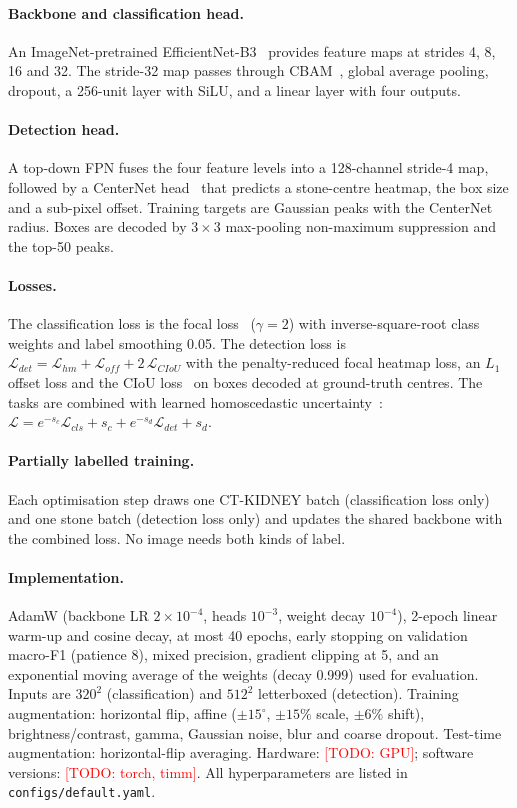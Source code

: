 \documentclass[11pt]{article}
\newcommand{\todo}[1]{\textcolor{red}{[TODO: #1]}}
\begin{document}
\paragraph{Backbone and classification head.} An ImageNet-pretrained EfficientNet-B3~\citep{tan2019efficientnet}
provides feature maps at strides 4, 8, 16 and 32. The stride-32 map passes through CBAM~\citep{woo2018cbam},
global average pooling, dropout, a 256-unit layer with SiLU, and a linear layer with four outputs.

\paragraph{Detection head.} A top-down FPN fuses the four feature levels into a 128-channel stride-4 map,
followed by a CenterNet head~\citep{zhou2019objects} that predicts a stone-centre heatmap, the box size and a
sub-pixel offset. Training targets are Gaussian peaks with the CenterNet radius. Boxes are decoded by
$3{\times}3$ max-pooling non-maximum suppression and the top-50 peaks.

\paragraph{Losses.} The classification loss is the focal loss~\citep{lin2017focal} ($\gamma{=}2$) with
inverse-square-root class weights and label smoothing 0.05. The detection loss is
$\mathcal{L}_{det}=\mathcal{L}_{hm}+\mathcal{L}_{off}+2\,\mathcal{L}_{CIoU}$ with the penalty-reduced focal
heatmap loss, an $L_1$ offset loss and the CIoU loss~\citep{zheng2020diou} on boxes decoded at ground-truth centres.
The tasks are combined with learned homoscedastic uncertainty~\citep{kendall2018multi}:
$\mathcal{L}=e^{-s_c}\mathcal{L}_{cls}+s_c+e^{-s_d}\mathcal{L}_{det}+s_d$.

\paragraph{Partially labelled training.} Each optimisation step draws one CT-KIDNEY batch (classification loss
only) and one stone batch (detection loss only) and updates the shared backbone with the combined loss.
No image needs both kinds of label.

\paragraph{Implementation.} AdamW (backbone LR $2{\times}10^{-4}$, heads $10^{-3}$, weight decay $10^{-4}$),
2-epoch linear warm-up and cosine decay, at most 40 epochs, early stopping on validation macro-F1 (patience 8),
mixed precision, gradient clipping at 5, and an exponential moving average of the weights (decay 0.999) used for
evaluation. Inputs are $320^2$ (classification) and $512^2$ letterboxed (detection). Training augmentation:
horizontal flip, affine ($\pm15^\circ$, $\pm15\%$ scale, $\pm6\%$ shift), brightness/contrast, gamma, Gaussian
noise, blur and coarse dropout. Test-time augmentation: horizontal-flip averaging. Hardware: \todo{GPU};
software versions: \todo{torch, timm}. All hyperparameters are listed in \texttt{configs/default.yaml}.
\end{document}

